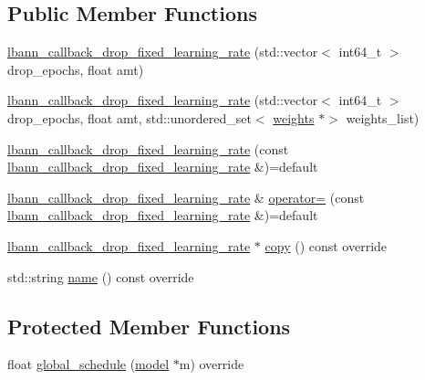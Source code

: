 \subsection*{Public Member Functions}
\begin{DoxyCompactItemize}
\item 
\hyperlink{classlbann_1_1lbann__callback__drop__fixed__learning__rate_a28f58eb50813e638d865179d645908f2}{lbann\+\_\+callback\+\_\+drop\+\_\+fixed\+\_\+learning\+\_\+rate} (std\+::vector$<$ int64\+\_\+t $>$ drop\+\_\+epochs, float amt)
\item 
\hyperlink{classlbann_1_1lbann__callback__drop__fixed__learning__rate_acd69c6b5aa7e4d799dba7dab2cd5daa4}{lbann\+\_\+callback\+\_\+drop\+\_\+fixed\+\_\+learning\+\_\+rate} (std\+::vector$<$ int64\+\_\+t $>$ drop\+\_\+epochs, float amt, std\+::unordered\+\_\+set$<$ \hyperlink{classlbann_1_1weights}{weights} $\ast$$>$ weights\+\_\+list)
\item 
\hyperlink{classlbann_1_1lbann__callback__drop__fixed__learning__rate_a5bb3a2e1d490d128e27dd1df2503644d}{lbann\+\_\+callback\+\_\+drop\+\_\+fixed\+\_\+learning\+\_\+rate} (const \hyperlink{classlbann_1_1lbann__callback__drop__fixed__learning__rate}{lbann\+\_\+callback\+\_\+drop\+\_\+fixed\+\_\+learning\+\_\+rate} \&)=default
\item 
\hyperlink{classlbann_1_1lbann__callback__drop__fixed__learning__rate}{lbann\+\_\+callback\+\_\+drop\+\_\+fixed\+\_\+learning\+\_\+rate} \& \hyperlink{classlbann_1_1lbann__callback__drop__fixed__learning__rate_ab1c5f9e9d8019d203bbbc1652e2950bd}{operator=} (const \hyperlink{classlbann_1_1lbann__callback__drop__fixed__learning__rate}{lbann\+\_\+callback\+\_\+drop\+\_\+fixed\+\_\+learning\+\_\+rate} \&)=default
\item 
\hyperlink{classlbann_1_1lbann__callback__drop__fixed__learning__rate}{lbann\+\_\+callback\+\_\+drop\+\_\+fixed\+\_\+learning\+\_\+rate} $\ast$ \hyperlink{classlbann_1_1lbann__callback__drop__fixed__learning__rate_aad86be992434394974b50d1f1c303bbf}{copy} () const override
\item 
std\+::string \hyperlink{classlbann_1_1lbann__callback__drop__fixed__learning__rate_a715d550fb9ec99e32861f91299669c35}{name} () const override
\end{DoxyCompactItemize}
\subsection*{Protected Member Functions}
\begin{DoxyCompactItemize}
\item 
float \hyperlink{classlbann_1_1lbann__callback__drop__fixed__learning__rate_a2ee62bfde00d7f1a4e55e4a334160fbe}{global\+\_\+schedule} (\hyperlink{classlbann_1_1model}{model} $\ast$m) override
\end{DoxyCompactItemize}
